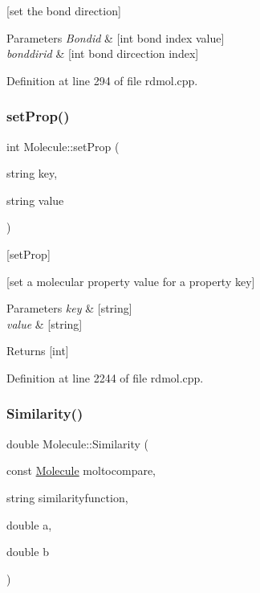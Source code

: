 \mbox{[}set the bond direction\mbox{]}


\begin{DoxyParams}{Parameters}
{\em Bondid} & \mbox{[}int bond index value\mbox{]} \\
\hline
{\em bonddirid} & \mbox{[}int bond dircection index\mbox{]} \\
\hline
\end{DoxyParams}


Definition at line 294 of file rdmol.\+cpp.

\mbox{\label{class_molecule_a25264008a24371142100f10ab7907d6f}} 
\subsubsection{\texorpdfstring{set\+Prop()}{setProp()}}
{\footnotesize\ttfamily int Molecule\+::set\+Prop (\begin{DoxyParamCaption}\item[{string}]{key,  }\item[{string}]{value }\end{DoxyParamCaption})}



\mbox{[}set\+Prop\mbox{]} 

\mbox{[}set a molecular property value for a property key\mbox{]}


\begin{DoxyParams}{Parameters}
{\em key} & \mbox{[}string\mbox{]} \\
\hline
{\em value} & \mbox{[}string\mbox{]}\\
\hline
\end{DoxyParams}
\begin{DoxyReturn}{Returns}
\mbox{[}int\mbox{]} 
\end{DoxyReturn}


Definition at line 2244 of file rdmol.\+cpp.

\mbox{\label{class_molecule_a43f990a0c0e9f3952c4a1e2f0ba75117}} 
\subsubsection{\texorpdfstring{Similarity()}{Similarity()}}
{\footnotesize\ttfamily double Molecule\+::\+Similarity (\begin{DoxyParamCaption}\item[{const \mbox{\hyperlink{class_molecule}{Molecule}}}]{moltocompare,  }\item[{string}]{similarityfunction,  }\item[{double}]{a,  }\item[{double}]{b }\end{DoxyParamCaption})}



